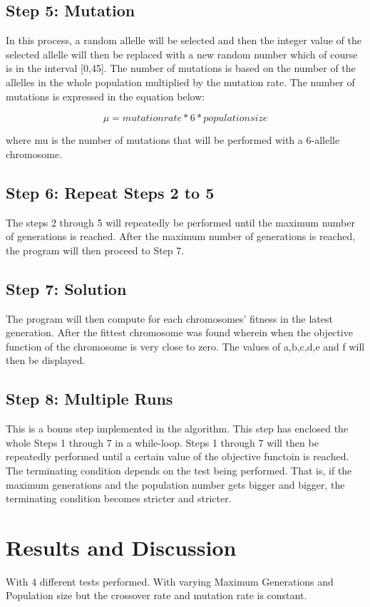 \documentclass{acm_proc_article-sp}
\begin{document}
\subsection{Step 5: Mutation}
In this process, a random allelle will be selected and then the integer value of the selected allelle will then be replaced with a new random number which of course is in the interval [0,45]. The number of mutations is based on the number of the allelles in the whole population multiplied by the mutation rate. The number of mutations is expressed in the equation below:

\begin{equation}
\mu = mutationrate*6*populationsize
\end{equation}

where mu is the number of mutations that will be performed with a 6-allelle chromosome.

\subsection{Step 6: Repeat Steps 2 to 5}
The steps 2 through 5 will repeatedly be performed until the maximum number of generations is reached. After the maximum number of generations is reached, the program will then proceed to Step 7.

\subsection{Step 7: Solution}
The program will then compute for each chromosomes' fitness in the latest generation. After the fittest chromosome was found wherein when the objective function of the chromosome is very close to zero. The values of a,b,c,d,e and f will then be displayed.

\subsection{Step 8: Multiple Runs}
This is a bonus step implemented in the algorithm. This step has enclosed the whole Steps 1 through 7 in a while-loop. Steps 1 through 7 will then be repeatedly performed until a certain value of the objective functoin is reached. The terminating condition depends on the test being performed. That is, if the maximum generations and the population number gets bigger and bigger, the terminating condition becomes stricter and stricter.

\section{Results and Discussion}
With 4 different tests performed. With varying Maximum Generations and Population size but the crossover rate and mutation rate is constant.
\end{document}
